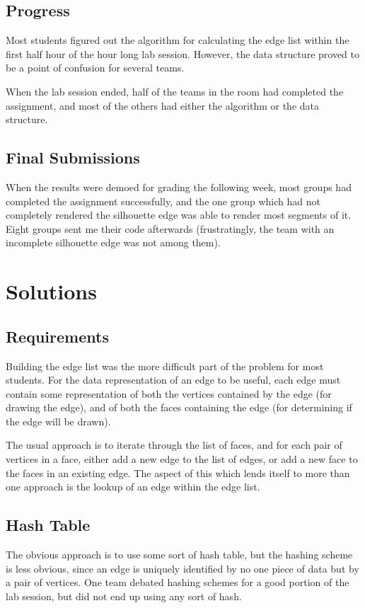\documentclass[10pt,twocolumn]{article}
\begin{document}
\subsection{Progress}
Most students figured out the algorithm for calculating the edge list within the first half hour of the hour long lab session.  However, the data structure proved to be a point of confusion for several teams.  

When the lab session ended, half of the teams in the room had completed the assignment, and most of the others had either the algorithm or the data structure.  

\subsection{Final Submissions}
When the results were demoed for grading the following week, most groups had completed the assignment successfully, and the one group which had not completely rendered the silhouette edge was able to render most segments of it.  Eight groups sent me their code afterwards (frustratingly, the team with an incomplete silhouette edge was not among them).  

\section{Solutions}
\subsection{Requirements}
Building the edge list was the more difficult part of the problem for most students.  For the data representation of an edge to be useful, each edge must contain some representation of both the vertices contained by the edge (for drawing the edge), and of both the faces containing the edge (for determining if the edge will be drawn).  

The usual approach is to iterate through the list of faces, and for each pair of vertices in a face, either add a new edge to the list of edges, or add a new face to the faces in an existing edge.  The aspect of this which lends itself to more than one approach is the lookup of an edge within the edge list.  

\subsection{Hash Table}
The obvious approach is to use some sort of hash table, but the hashing scheme is less obvious, since an edge is uniquely identified by no one piece of data but by a pair of vertices.  One team debated hashing schemes for a good portion of the lab session, but did not end up using any sort of hash.  
\end{document}
